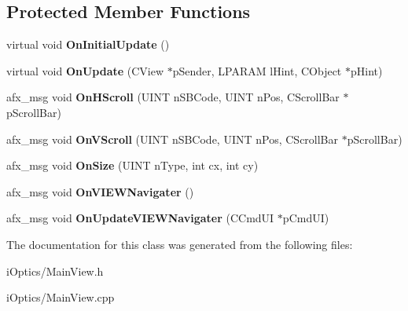 \subsection*{Protected Member Functions}
\begin{DoxyCompactItemize}
\item 
\mbox{\label{class_c_main_view_a93bdba23fa8dba336cd7db35eb969a95}} 
virtual void {\bfseries On\+Initial\+Update} ()
\item 
\mbox{\label{class_c_main_view_a31c5f6d53bc32a681bc3734b80bbf8e8}} 
virtual void {\bfseries On\+Update} (C\+View $\ast$p\+Sender, L\+P\+A\+R\+AM l\+Hint, C\+Object $\ast$p\+Hint)
\item 
\mbox{\label{class_c_main_view_ad124fdedf5446133d7f0bd8215dab7f3}} 
afx\+\_\+msg void {\bfseries On\+H\+Scroll} (U\+I\+NT n\+S\+B\+Code, U\+I\+NT n\+Pos, C\+Scroll\+Bar $\ast$p\+Scroll\+Bar)
\item 
\mbox{\label{class_c_main_view_a4aac5578dc8d6b4675dcf328e0c733a8}} 
afx\+\_\+msg void {\bfseries On\+V\+Scroll} (U\+I\+NT n\+S\+B\+Code, U\+I\+NT n\+Pos, C\+Scroll\+Bar $\ast$p\+Scroll\+Bar)
\item 
\mbox{\label{class_c_main_view_ac2b15b975f167969c9903f7264565607}} 
afx\+\_\+msg void {\bfseries On\+Size} (U\+I\+NT n\+Type, int cx, int cy)
\item 
\mbox{\label{class_c_main_view_a1c9c04a4992fa275696d7a58e927c2be}} 
afx\+\_\+msg void {\bfseries On\+V\+I\+E\+W\+Navigater} ()
\item 
\mbox{\label{class_c_main_view_a9df07ffc397963f1347b952d0fcfb9ea}} 
afx\+\_\+msg void {\bfseries On\+Update\+V\+I\+E\+W\+Navigater} (C\+Cmd\+UI $\ast$p\+Cmd\+UI)
\end{DoxyCompactItemize}


The documentation for this class was generated from the following files\+:\begin{DoxyCompactItemize}
\item 
i\+Optics/Main\+View.\+h\item 
i\+Optics/Main\+View.\+cpp\end{DoxyCompactItemize}
